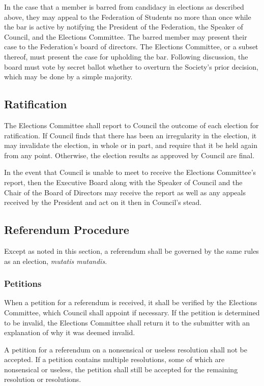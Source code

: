 In the case that a member is barred from candidacy in elections as described above, they may appeal to the Federation of Students no more than once while the bar is active by notifying the President of the Federation, the Speaker of Council, and the Elections Committee. The barred member may present their case to the Federation's board of directors. The Elections Committee, or a subset thereof, must present the case for upholding the bar. Following discussion, the board must vote by secret ballot whether to overturn the Society's prior decision, which may be done by a simple majority.

\subsection{Ratification}
The Elections Committee shall report to Council the outcome of each election for ratification.
If Council finds that there has been an irregularity in the election, it may invalidate the election, in whole or in part, and require that it be held again from any point.
Otherwise, the election results as approved by Council are final.

In the event that Council is unable to meet to receive the Elections Committee's report, then the Executive Board along with the Speaker of Council and the Chair of the Board of Directors  may receive the report as well as any appeals received by the President and act on it then in Council's stead.

\subsection{Referendum Procedure}
Except as noted in this section, a referendum shall be governed by the same rules as an election, \emph{mutatis mutandis}.

\subsubsection{Petitions}
When a petition for a referendum is received, it shall be verified by the Elections Committee, which Council shall appoint if necessary.
If the petition is determined to be invalid, the Elections Committee shall return it to the submitter with an explanation of why it was deemed invalid.

A petition for a referendum on a nonsensical or useless resolution shall not be accepted.
If a petition contains multiple resolutions, some of which are nonsensical or useless, the petition shall still be accepted for the remaining resolution or resolutions.


